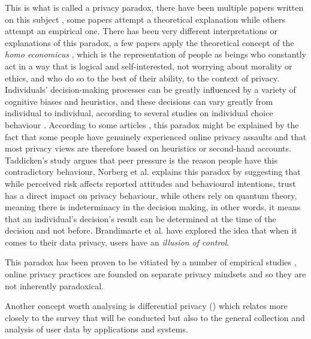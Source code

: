 This is what is called a privacy paradox, there have been multiple papers
written on this subject \cite{solove2021myth, WilliamsPrivacy, lee2021investigating, goad2021privacy, gerber2018explaining},
some papers attempt a theoretical explanation while others attempt an empirical
one. There has been very different interpretations or explanations of this
paradox, a few papers \cite{wilson2012unpacking, warshaw2015can, lee2015privacy}
apply the theoretical concept of the \textit{homo economicus} \cite{zak2008moral},
which is the representation of people as beings who constantly act in a
way that is logical and self-interested, not worrying about morality or
ethics, and who do so to the best of their ability, to the context of privacy.
Individuals' decision-making processes can be greatly influenced by a variety
of cognitive biases and heuristics, and these decisions can vary greatly from
individual to individual, according to several studies on individual choice behaviour \cite{knijnenburg2013dimensionality, wakefield2013influence, flender2012type}.
According to some articles \cite{dienlin2015privacy, baek2014solving},
this paradox might be explained by the fact that some people have genuinely
experienced online privacy assaults and that most privacy views are therefore
based on heuristics or second-hand accounts. Taddicken's study \cite{taddicken2014privacy}
argues that peer pressure is the reason people have this contradictory behaviour,
Norberg et al. \cite{norberg2007privacy} explains this paradox by suggesting
that while perceived risk affects reported attitudes and behavioural intentions,
trust has a direct impact on privacy behaviour, while others \cite{flender2012type, kokolakis2017privacy}
rely on quantum theory, meaning there is indeterminacy in the decision making,
in other words, it means that an individual's decision's result can be determined
at the time of the decision and not before. Brandimarte et al. \cite{brandimarte2013misplaced}
have explored the idea that when it comes to their data privacy, users have
an \textit{illusion of control}.

This paradox has been proven to be vitiated by a number of empirical studies \cite{dienlin2015privacy, xie2019consumers, SCHWAIG20131, sannon2018privacy},
online privacy practices are founded on separate privacy mindsets and so
they are not inherently paradoxical.

Another concept worth analysing is differential privacy (\hyperlink{\acronym}{\acronym}) which relates more
closely to the survey that will be conducted but also to the general
collection and analysis of user data by applications and systems.

